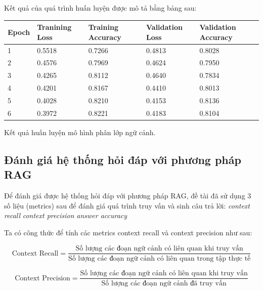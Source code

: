 \documentclass[a4paper, 12pt, openany]{book}
\begin{document}
Kết quả của quá trình huấn luyện được mô tả bằng bảng sau:

\vspace{0.5cm}
\begin{minipage}{\linewidth}
    \centering
    \begin{tabular}{ | m{1cm} | m{2cm} | m{2cm} | m{2cm} | m{2cm} |} 
        \hline
        \textbf{Epoch} & \textbf{Tranining Loss} & \textbf{Training Accuracy}  & \textbf{Validation Loss} & \textbf{Validation Accuracy} \\
        \hline
        1 & 0.5518 & 0.7266 & 0.4813 & 0.8028 \\
        \hline
        2 & 0.4576 & 0.7969 & 0.4624 & 0.7950 \\
        \hline
        3 & 0.4265 & 0.8112 & 0.4640 & 0.7834 \\
        \hline
        4 & 0.4201 & 0.8167 & 0.4410 & 0.8013 \\
        \hline
        5 & 0.4028 & 0.8210 & 0.4153 & 0.8136 \\
        \hline
        6 & 0.3972 & 0.8221 & 0.4183 & 0.8104 \\
        \hline
    \end{tabular}
    \captionsetup{type=table}
    \caption{Kết quả huấn luyện mô hình phân lớp ngữ cảnh.}

\end{minipage}

\subsection{Đánh giá hệ thống hỏi đáp với phương pháp RAG}

Để đánh giá được hệ thống hỏi đáp với phương pháp RAG, đề tài đã sử dụng 3 số liệu (metrics) sau để đánh giá quá trình
truy vấn và sinh câu trả lời: \textit{context recall} \textit{context precision} \textit{answer accuracy}

Ta có công thức để tính các metrics context recall và context precision như sau:

\begin{equation}
    \text{Context Recall} = \frac{\text{Số lượng các đoạn ngữ cảnh có liên quan khi truy vấn}}{\text{Số lượng các đoạn ngữ cảnh có liên quan trong tập thực tế}}
\end{equation}
    
\begin{equation}
\text{Context Precision} = \frac{\text{Số lượng các đoạn ngữ cảnh có liên quan khi truy vấn}}{\text{Số lượng các đoạn ngữ cảnh đã truy vấn}}
\end{equation}
\end{document}

